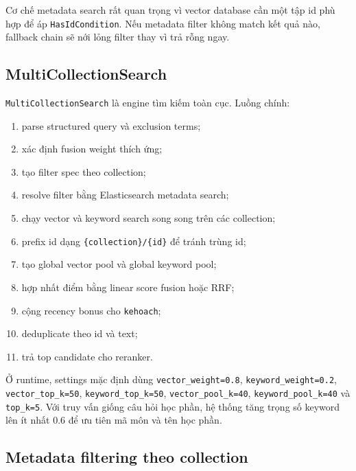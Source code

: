 \documentclass[../DoAn.tex]{subfiles}
\begin{document}
Cơ chế metadata search rất quan trọng vì vector database cần một tập id phù hợp
để áp \texttt{HasIdCondition}. Nếu metadata filter không match kết quả nào,
fallback chain sẽ nới lỏng filter thay vì trả rỗng ngay.

\subsection{MultiCollectionSearch}

\texttt{MultiCollectionSearch} là engine tìm kiếm toàn cục. Luồng chính:

\begin{enumerate}
    \item parse structured query và exclusion terms;
    \item xác định fusion weight thích ứng;
    \item tạo filter spec theo collection;
    \item resolve filter bằng Elasticsearch metadata search;
    \item chạy vector và keyword search song song trên các collection;
    \item prefix id dạng \texttt{\{collection\}/\{id\}} để tránh trùng id;
    \item tạo global vector pool và global keyword pool;
    \item hợp nhất điểm bằng linear score fusion hoặc RRF;
    \item cộng recency bonus cho \texttt{kehoach};
    \item deduplicate theo id và text;
    \item trả top candidate cho reranker.
\end{enumerate}

Ở runtime, settings mặc định dùng \texttt{vector\_weight=0.8},
\texttt{keyword\_weight=0.2}, \texttt{vector\_top\_k=50},
\texttt{keyword\_top\_k=50}, \texttt{vector\_pool\_k=40},
\texttt{keyword\_pool\_k=40} và \texttt{top\_k=5}. Với truy vấn giống câu hỏi học
phần, hệ thống tăng trọng số keyword lên ít nhất 0.6 để ưu tiên mã môn và tên
học phần.

\subsection{Metadata filtering theo collection}
\end{document}
